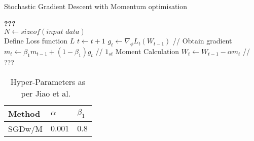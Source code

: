 \begin{algorithm}
  \caption{Stochastic Gradient Descent with Momentum optimisation}
  \begin{algorithmic}[1]
    \STATE \textbf{???} \\ $N\gets sizeof(\textit{input data})$\\
    \STATE Define Loss function $L$
    \STATE $t \gets t+1$
    \STATE $g_t \gets \nabla_\phi L_t (W_{t-1})$ // Obtain gradient
    \STATE $m_t \gets \beta_1 m_{t-1}+(1-\beta_1) g_t $ // $1_{st}$ Moment Calculation \label{alg:SGDwM-Line-Moment}
    \STATE $W_t \gets W_{t-1} - \alpha m_t $  // ???
    \ENDWHILE
  \end{algorithmic}
  \label{alg:SGDwM}
\end{algorithm}
\begin{table}[ht]
    \centering
    \caption{Hyper-Parameters as per Jiao et al.~\cite{jiao_gru-rnn_2020}}
    \label{tab:params-jiao}
    \begin{tabular}{ p{6.0cm} p{1.5cm} p{1.5cm}   }
        \hline
        Method     & $\alpha$ & $\beta_1 $  \\
        \hline
        SGDw/M
                & $0.001$ & $0.8$  \\%
        \hline
    \end{tabular}
\end{table}
